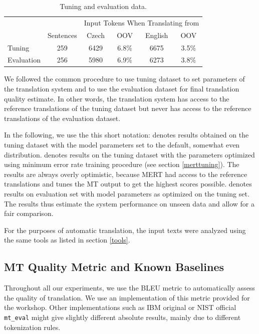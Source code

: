 \documentclass[10pt]{report}
\theoremstyle{plain}
\begin{document}
{{\begin{table}[ht]
\begin{center}
\begin{tabular}{lccccc}
  &    &  \multicolumn{4}{c}{Input Tokens When Translating from}\\
   &  Sentences   &  Czech  &  OOV   &  English  &  OOV\\
\hline
Tuning   &  259  &  6429  &  6.8\%  &  6675  &  3.5\%\\
Evaluation  &  256  &  5980  &  6.9\%  &  6273  &  3.8\%\\
\end{tabular}
\end{center}
\caption{Tuning and evaluation data.}
\label{tuneevaldata}
\end{table}

We followed the common procedure to use tuning dataset to set parameters of the
translation system and to use the evaluation dataset for final translation
quality estimate. In other words, the translation system has access to the
reference translations of the tuning dataset but never has access to the
reference translations of the evaluation dataset.

In the following, we use the this short notation:  denotes
results obtained on the tuning dataset with the model parameters set to the
default, somewhat even distribution.  denotes results on the
tuning dataset with the parameters optimized using minimum error rate training
procedure (see section \ref{merttuning}). The  results are always overly
optimistic, because MERT had access to the reference translations and tunes the
MT output to get the highest scores possible.  denotes results on evaluation set with model parameters as optimized on
the tuning set. The  results thus estimate the system
performance on unseen data and allow for a fair comparison.

For the purposes of automatic translation, the input texts were analyzed using
the same tools as listed in section \ref{tools}.



\subsection{MT Quality Metric and Known Baselines}
\label{baselines}

Throughout all our experiments, we use the BLEU metric 
to automatically assess the quality of translation. We use an implementation of
this metric provided for the workshop. Other implementations such as IBM
original or NIST official {\tt mt\_eval} might give slightly
different absolute results, mainly due to different tokenization rules.

}}
\end{document}
